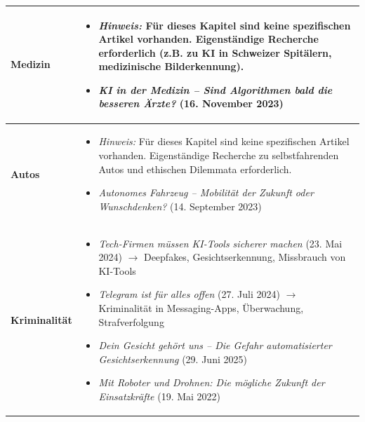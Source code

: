 \begin{longtable}{@{}lp{14cm}@{}}
	\textbf{Medizin} &
	\begin{itemize}[leftmargin=*,noitemsep,topsep=0pt]
		\item \textit{Hinweis:} Für dieses Kapitel sind keine spezifischen Artikel vorhanden. Eigenständige Recherche erforderlich (z.B. zu KI in Schweizer Spitälern, medizinische Bilderkennung).
		\item[\faPlayCircle{}] \textit{KI in der Medizin -- Sind Algorithmen bald die besseren Ärzte?} (16. November 2023) \href{https://www.srf.ch/play/tv/nzz-format/video/ki-in-der-medizin---sind-algorithmen-bald-die-besseren-aerzte?urn=urn:srf:video:0d2820b2-175f-4832-b51e-8b4008963a8a}{\faLink}
	\end{itemize} \\
	\midrule

	\textbf{Autos} &
	\begin{itemize}[leftmargin=*,noitemsep,topsep=0pt]
		\item \textit{Hinweis:} Für dieses Kapitel sind keine spezifischen Artikel vorhanden. Eigenständige Recherche zu selbstfahrenden Autos und ethischen Dilemmata erforderlich.
		\item[\faPlayCircle{}] \textit{Autonomes Fahrzeug -- Mobilität der Zukunft oder Wunschdenken?} (14. September 2023) \href{https://www.srf.ch/play/tv/einstein/video/autonomes-fahrzeug-mobilitaet-der-zukunft-oder-wunschdenken?urn=urn:srf:video:e107b861-fb6b-48e0-9471-4f55de35498c}{\faLink}
	\end{itemize} \\
	\midrule

	\textbf{Kriminalität} &
	\begin{itemize}[leftmargin=*,noitemsep,topsep=0pt]
		\item[\faFilePdf{}] \textit{Tech-Firmen müssen KI-Tools sicherer machen} (23. Mai 2024) \newline
		$\rightarrow$ Deepfakes, Gesichtserkennung, Missbrauch von KI-Tools
		\item[\faFilePdf{}] \textit{Telegram ist für alles offen} (27. Juli 2024) \newline
		$\rightarrow$ Kriminalität in Messaging-Apps, Überwachung, Strafverfolgung
		\item[\faPlayCircle{}] \textit{Dein Gesicht gehört uns -- Die Gefahr automatisierter Gesichtserkennung} (29. Juni 2025) \href{https://www.srf.ch/play/tv/dok/video/dein-gesicht-gehoert-uns---die-gefahr-automatischer-gesichtserkennung?urn=urn:srf:video:6596261a-5936-4d5f-9c6c-51c985e91534}{\faLink}
		\item[\faPlayCircle{}] \textit{Mit Roboter und Drohnen: Die mögliche Zukunft der Einsatzkräfte} (19. Mai 2022) \href{https://www.srf.ch/play/tv/einstein/video/mit-roboter-und-drohnen-die-moegliche-zukunft-der-einsatzkraefte?urn=urn:srf:video:4b1b9ca9-32f2-44f3-a4fd-5ee02b59cbfa}{\faLink}
	\end{itemize} \\
	\midrule


\end{longtable}
